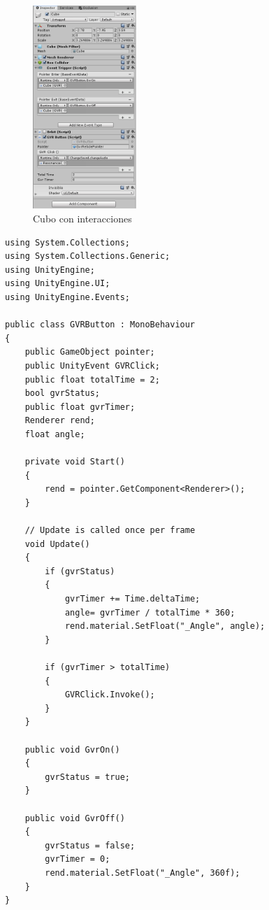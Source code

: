 \begin{figure}[htb]
	\centering
	\includegraphics[width=0.35\textwidth]{./imagenes/cube}
	\caption{Cubo con interacciones}
\end{figure} 

\lstset{language=[sharp]C, breaklines=true, basicstyle=\footnotesize}
\begin{lstlisting}[frame=single, caption={GVRButton.cs}]
using System.Collections;
using System.Collections.Generic;
using UnityEngine;
using UnityEngine.UI;
using UnityEngine.Events;

public class GVRButton : MonoBehaviour
{
    public GameObject pointer;
    public UnityEvent GVRClick;
    public float totalTime = 2;
    bool gvrStatus;
    public float gvrTimer;
    Renderer rend;
    float angle;

    private void Start()
    {
        rend = pointer.GetComponent<Renderer>();
    }

    // Update is called once per frame
    void Update()
    {
        if (gvrStatus)
        {
            gvrTimer += Time.deltaTime;
            angle= gvrTimer / totalTime * 360;
            rend.material.SetFloat("_Angle", angle);
        }

        if (gvrTimer > totalTime)
        {
            GVRClick.Invoke();
        }
    }

    public void GvrOn()
    {
        gvrStatus = true;
    }

    public void GvrOff()
    {
        gvrStatus = false;
        gvrTimer = 0;
        rend.material.SetFloat("_Angle", 360f);
    }
}

\end{lstlisting}

